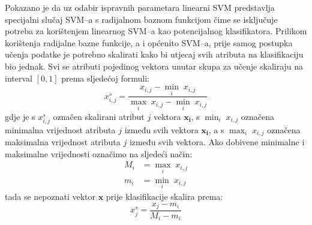 \documentclass[11pt,english]{article}
\begin{document}
\begin{multicols}{2}
Pokazano je da uz odabir ispravnih parametara \citep{keerthi2003asymptotic} linearni SVM
predstavlja specijalni slučaj SVM--a s radijalnom baznom funkcijom čime
se isključuje potreba za korištenjem linearnog SVM--a kao potencijalnog
klasifikatora. Prilikom korištenja radijalne bazne funkcije, a i općenito
SVM--a, prije samog postupka učenja podatke je potrebno skalirati kako bi utjecaj svih
atributa na klasifikaciju bio jednak. Svi se atributi pojedinog vektora unutar
skupa za učenje skaliraju na interval $[0, 1]$ prema sljedećoj formuli:
\begin{equation}
x^{s}_{i,j} = \frac{x_{i,j} - \min_{i}\; x_{i,j}}{\max_{i}\; x_{i,j}
- \min_{i}\; x_{i,j}}
\end{equation}
gdje je s $x^{s}_{i,j}$ označen skalirani atribut $j$ vektora $\mathbf{x_i}$, s
$\min_{i}\; x_{i,j}$ označena minimalna vrijednost atributa $j$ između svih
vektora $\mathbf{x_i}$, a s $\max_{i}\; x_{i,j}$ označena maksimalna vrijednost
atributa $j$ između svih vektora. Ako dobivene minimalne i maksimalne vrijednosti označimo na sljedeći
način:
\begin{eqnarray}
M_i & = \max_{i}\; x_{i,j} \\
m_i & = \min_{i}\; x_{i,j}
\end{eqnarray}
tada se nepoznati vektor $\mathbf{x}$ prije klasifikacije skalira prema:
\begin{equation}
x^{s}_{j} = \frac{x_j-m_i}{M_i-m_i}
\end{equation}



\end{multicols}
\end{document}
